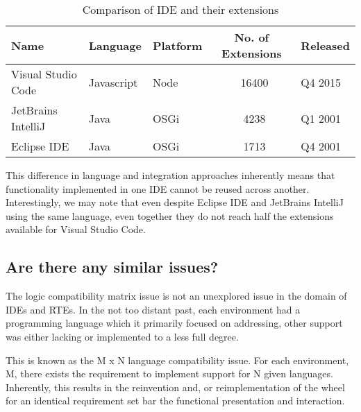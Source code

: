 








\begin{table}[h!]
\centering
\begin{tabular}{|l|l|l|c|l|}
	\hline 
	\rule[-1ex]{0pt}{2.5ex} Name & Language & Platform & No. of Extensions & Released \\ 
	\hline 
	\hline 
	\rule[-1ex]{0pt}{2.5ex} Visual Studio Code & Javascript & Node & ~16400 & Q4 2015\\ 
	\hline 
	\rule[-1ex]{0pt}{2.5ex} JetBrains IntelliJ & Java & OSGi  & ~4238 & Q1 2001 \\ 
	\hline 
	\rule[-1ex]{0pt}{2.5ex} Eclipse IDE & Java & OSGi & ~1713 & Q4 2001 \\ 
	\hline 
\end{tabular} 
\caption{Comparison of IDE and their extensions}
\end{table}

This difference in language and integration approaches inherently means that functionality implemented in one IDE cannot be reused across another. Interestingly, we may note that even despite Eclipse IDE and JetBrains IntelliJ using the same language, even together they do not reach half the extensions available for Visual Studio Code.

\subsection{Are there any similar issues?}

The logic compatibility matrix issue is not an unexplored issue in the domain of IDEs and RTEs. In the not too distant past, each environment had a programming language which it primarily focused on addressing, other support was either lacking or implemented to a less full degree. 

This is known as the M x N language compatibility issue. For each environment, M, there exists the requirement to implement support for N given languages. Inherently, this results in the reinvention and, or reimplementation of the wheel for an identical requirement set bar the functional presentation and interaction.

